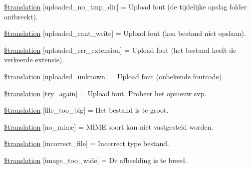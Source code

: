 \begin{DoxyCompactItemize}
\hyperlink{class_8upload_8nl___n_l_8php_ae3cdc68fe248399f77246c91b0555341}{\$translation} \mbox{[}\textquotesingle{}uploaded\+\_\+no\+\_\+tmp\+\_\+dir\textquotesingle{}\mbox{]} = \textquotesingle{}Upload fout (de tijdelijke opslag folder ontbreekt).\textquotesingle{}
\item 
\hyperlink{class_8upload_8nl___n_l_8php_af368fee3b41bc05e6b208c1557a00c00}{\$translation} \mbox{[}\textquotesingle{}uploaded\+\_\+cant\+\_\+write\textquotesingle{}\mbox{]} = \textquotesingle{}Upload fout (kon bestand niet opslaan).\textquotesingle{}
\item 
\hyperlink{class_8upload_8nl___n_l_8php_a01c69a4c8556602b3892dce727bace11}{\$translation} \mbox{[}\textquotesingle{}uploaded\+\_\+err\+\_\+extension\textquotesingle{}\mbox{]} = \textquotesingle{}Upload fout (het bestand heeft de verkeerde extensie).\textquotesingle{}
\item 
\hyperlink{class_8upload_8nl___n_l_8php_a4a9168e922b827e6a28b5db1c00774ca}{\$translation} \mbox{[}\textquotesingle{}uploaded\+\_\+unknown\textquotesingle{}\mbox{]} = \textquotesingle{}Upload fout (onbekende foutcode).\textquotesingle{}
\item 
\hyperlink{class_8upload_8nl___n_l_8php_a3afc377bd803683314f413a814243066}{\$translation} \mbox{[}\textquotesingle{}try\+\_\+again\textquotesingle{}\mbox{]} = \textquotesingle{}Upload fout. Probeer het opnieuw svp.\textquotesingle{}
\item 
\hyperlink{class_8upload_8nl___n_l_8php_a476278eb4a0c3df56af068e2d511a741}{\$translation} \mbox{[}\textquotesingle{}file\+\_\+too\+\_\+big\textquotesingle{}\mbox{]} = \textquotesingle{}Het bestand is te groot.\textquotesingle{}
\item 
\hyperlink{class_8upload_8nl___n_l_8php_a191a55df8e3bb7f3c51b70f3c1932e02}{\$translation} \mbox{[}\textquotesingle{}no\+\_\+mime\textquotesingle{}\mbox{]} = \textquotesingle{}M\+I\+M\+E soort kan niet vastgesteld worden.\textquotesingle{}
\item 
\hyperlink{class_8upload_8nl___n_l_8php_a4d32343e2699edd6fd435f9c832cb9c7}{\$translation} \mbox{[}\textquotesingle{}incorrect\+\_\+file\textquotesingle{}\mbox{]} = \textquotesingle{}Incorrect type bestand.\textquotesingle{}
\item 
\hyperlink{class_8upload_8nl___n_l_8php_a0dd3e4930ca1f59ae280f4b1006525cd}{\$translation} \mbox{[}\textquotesingle{}image\+\_\+too\+\_\+wide\textquotesingle{}\mbox{]} = \textquotesingle{}De afbeelding is te breed.\textquotesingle{}
\item 

\end{DoxyCompactItemize}
